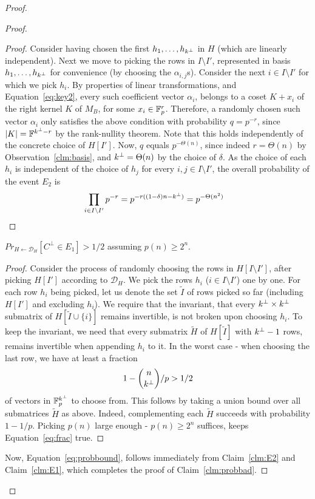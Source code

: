 \begin{proof}
\begin{proof}
\begin{proof}
Consider having chosen the first $h_1,\ldots,h_{k^\bot}$ in $H$ (which are linearly independent). Next we move to picking the rows in $I\setminus I'$, represented in basis $h_1,\ldots,h_{k^\bot}$ for convenience (by choosing the $\alpha_{i,j}$s).
Consider the next $i\in I\setminus{I'}$ for which we pick $h_i$.
By properties of linear transformations, and Equation~\ref{eq:key2}, every such coefficient vector $\alpha_i$, belongs to a coset $K+x_i$ of the right kernel $K$ of $M_B$, for some $x_i\in \mathbb{F}^r_p$. %
Therefore, a randomly chosen such vector $\alpha_i$ only satisfies the above condition with probability $q = p^{-r}$,
since $|K|=\mathbb{F}^{k^\bot-r}$ by the rank-nullity theorem.
Note that this holds independently of the concrete choice of $H[I']$.
Now, $q$ equals $p^{-\Theta(n)}$, since indeed $r=\Theta(n)$ by Observation~\ref{clm:basis}, and $k^\bot=\Theta(n)$ by the choice of $\delta$.
As the choice of each $h_i$ is independent of the choice of $h_j$ for every $i,j\in I\setminus{I'}$, the overall probability of the event $E_2$ is 
\begin{align} \label{eq:probE2}
&\prod_{i\in I\setminus{I'}}p^{-r}=p^{-r((1-\delta)n-k^\bot)}=p^{-\Theta(n^2)}
\end{align}
\end{proof} %

\begin{claim} \label{clm:E1} %
$Pr_{H\leftarrow \mathcal{D}_H}[C^\bot \in E_1]>1/2$ assuming $p(n)\geq 2^n$.
\end{claim}

\begin{proof}
Consider the process of randomly choosing the rows in $H[I\setminus{I'}]$, after picking $H[I']$ according to $\mathcal{D}_H$. We pick the rows $h_i$ ($i\in I\setminus{I'}$) one by one. For each row $h_i$ being picked, let us denote the set $\tilde{I}$ of rows picked so far (including $H[I']$ and excluding $h_i$).
We require that the invariant, that every $k^\bot\times k^\bot$ submatrix of $H[\tilde{I}\cup\{i\}]$ remains invertible, is not broken upon choosing $h_i$. 
To keep the invariant, we need that every submatrix $\tilde{H}$ of $H[\tilde{I}]$ with $k^\bot-1$ rows, remains invertible when appending $h_i$ to it.
In the worst case - when choosing the last row, we have at least a fraction 
\begin{align}
1 - {\binom{n}{k^\bot}}/p>1/2 \label{eq:frac}
\end{align}
of vectors in $\mathbb{F}^{k^\bot}_p$ to choose from. 
This follows by taking a union bound over all submatrices $\tilde{H}$ as above.
Indeed, complementing each $\tilde{H}$ succeeds with probability $1-1/p$. Picking $p(n)$ large enough - $p(n)\geq 2^n$ suffices, keeps Equation~\ref{eq:frac} true.
\end{proof} %
Now, Equation~\ref{eq:probbound}, follows immediately from Claim~\ref{clm:E2} and Claim~\ref{clm:E1}, which completes the proof of Claim~\ref{clm:probbad}.
\end{proof} %



\end{proof}
